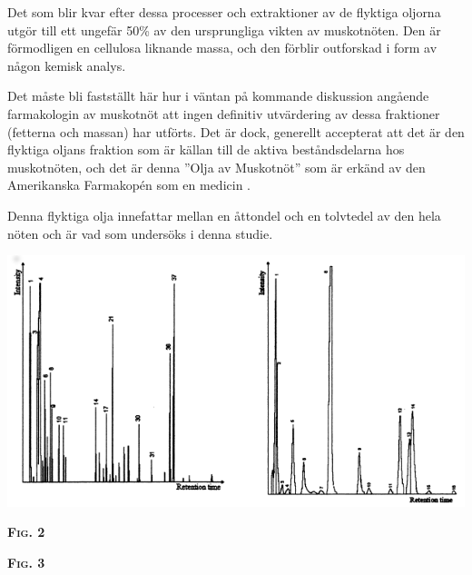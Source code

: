 \documentclass{theme/franska}
\begin{document}
Det som blir kvar efter dessa processer och extraktioner av de flyktiga oljorna utgör till ett ungefär 50\% av den ursprungliga vikten av muskotnöten. Den är förmodligen en cellulosa liknande massa, och den förblir outforskad i form av någon kemisk analys.

Det måste bli fastställt här hur i väntan på kommande diskussion angående farmakologin av muskotnöt att ingen definitiv utvärdering av dessa fraktioner (fetterna och massan) har utförts. Det är dock, generellt accepterat att det är den flyktiga oljans fraktion som är källan till de aktiva beståndsdelarna hos muskotnöten, och det är denna ''Olja av Muskotnöt'' som är erkänd av den Amerikanska Farmakopén som en medicin \cite{shulgin1967chemistry}.

Denna flyktiga olja innefattar mellan en åttondel och en tolvtedel av den hela nöten och är vad som undersöks i denna studie.

\hbox{\hspace{0cm}\includegraphics[scale=0.85]{GCgraph}}

\begin{minipage}[t]{2cm}
\flushleft
\textsc{\textbf{Fig. 2}}
\end{minipage}
\hfill
\begin{minipage}[t]{2cm}
\flushright
\textsc{\textbf{Fig. 3}}
\end{minipage}
\end{document}
